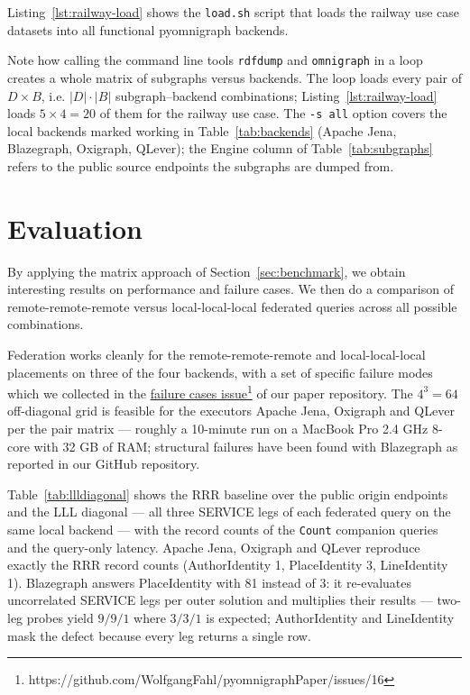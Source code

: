 \documentclass[
]{ceurart}
\newcommand{\footnotelink}[2]{\href{#1}{#2}\footnote{#1}}
\begin{document}
Listing~\ref{lst:railway-load} shows the \texttt{load.sh} script that loads the railway use case datasets into all functional pyomnigraph backends.


Note how calling the command line tools \texttt{rdfdump} and \texttt{omnigraph} in a loop creates a whole matrix of subgraphs versus backends.
The loop loads every pair of $D \times B$, i.e. $|D| \cdot |B|$ subgraph--backend combinations; Listing~\ref{lst:railway-load} loads $5 \times 4 = 20$ of them for the railway use case. The \texttt{-s all} option covers the local backends marked working in Table~\ref{tab:backends} (Apache Jena, Blazegraph, Oxigraph, QLever); the Engine column of Table~\ref{tab:subgraphs} refers to the public source endpoints the subgraphs are dumped from.

\section{Evaluation}\label{sec:evaluation}
By applying the matrix approach of Section~\ref{sec:benchmark}, we obtain interesting results on performance and failure cases. We then do a comparison of remote-remote-remote versus local-local-local federated queries across all possible combinations.

Federation works cleanly for the remote-remote-remote and local-local-local placements on three of the four backends, with a set of specific failure modes which we collected in the
\footnotelink{https://github.com/WolfgangFahl/pyomnigraphPaper/issues/16}{failure cases issue}
of our paper repository. The $4^3 = 64$ off-diagonal grid is feasible for the executors Apache Jena, Oxigraph and QLever per the pair matrix --- roughly a 10-minute run on a MacBook Pro 2.4 GHz 8-core with 32 GB of RAM; structural failures have been found with Blazegraph as reported in our GitHub repository.

Table~\ref{tab:llldiagonal} shows the RRR baseline over the public origin endpoints and the LLL diagonal --- all three SERVICE legs of each federated query on the same local backend --- with the record counts of the \texttt{Count} companion queries and the query-only latency. Apache Jena, Oxigraph and QLever reproduce exactly the RRR record counts (AuthorIdentity 1, PlaceIdentity 3, LineIdentity 1). Blazegraph answers PlaceIdentity with 81 instead of 3: it re-evaluates uncorrelated SERVICE legs per outer solution and multiplies their results --- two-leg probes yield $9/9/1$ where $3/3/1$ is expected; AuthorIdentity and LineIdentity mask the defect because every leg returns a single row.
\end{document}
